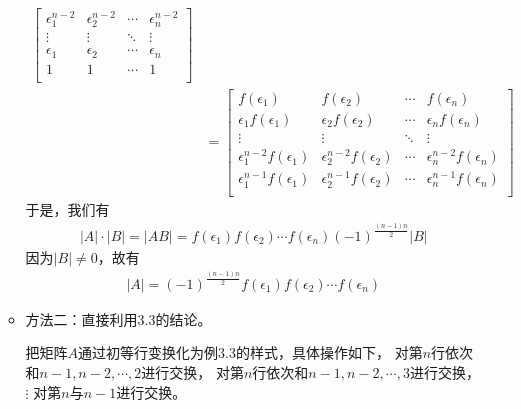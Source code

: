 \documentclass{article}
\begin{document}
\begin{itemize}
\begin{itemize}
\begin{align*}
\begin{bmatrix}
                    \epsilon_1^{n-2} & \epsilon_2^{n-2} & \cdots & \epsilon_n^{n-2} \\
                    \vdots           & \vdots           & \ddots & \vdots           \\
                    \epsilon_1       & \epsilon_2       & \cdots & \epsilon_n       \\
                    1                & 1                & \cdots & 1                \\
                  \end{bmatrix}                                                   \\
                      & = \begin{bmatrix}
                            f(\epsilon_1)                  & f(\epsilon_2)                  & \cdots & f(\epsilon_n)                  \\
                            \epsilon_1 f(\epsilon_1)       & \epsilon_2 f(\epsilon_2)       & \cdots & \epsilon_n f(\epsilon_n)       \\
                            \vdots                         & \vdots                         & \ddots & \vdots                         \\
                            \epsilon_1^{n-2} f(\epsilon_1) & \epsilon_2^{n-2} f(\epsilon_2) & \cdots & \epsilon_n^{n-2} f(\epsilon_n) \\
                            \epsilon_1^{n-1} f(\epsilon_1) & \epsilon_2^{n-1} f(\epsilon_2) & \cdots & \epsilon_n^{n-1} f(\epsilon_n) \\
                          \end{bmatrix}
                \end{align*}
                于是，我们有
                \begin{align*}
                  |A| \cdot |B| = |A B| = f(\epsilon_1)f(\epsilon_2)\cdots f(\epsilon_n) (-1)^{\frac{(n-1)n}{2}} |B|
                \end{align*}
                因为$|B| \neq 0$，故有
                \begin{align*}
                  |A| = (-1)^{\frac{(n-1)n}{2}} f(\epsilon_1)f(\epsilon_2)\cdots f(\epsilon_n)
                \end{align*}

          \item 方法二：直接利用3.3的结论。

                把矩阵$A$通过初等行变换化为例3.3的样式，具体操作如下，
                对第$n$行依次和$n-1, n - 2, \cdots, 2$进行交换，
                对第$n$行依次和$n-1, n - 2, \cdots, 3$进行交换，
                $\vdots$
                对第$n$与$n-1$进行交换。


\end{itemize}
\end{itemize}
\end{document}
